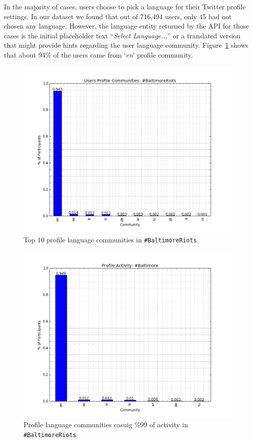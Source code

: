 In the majority of cases, users choose to pick a language for their
Twitter profile settings. In our dataset we found that out of 716,494
users, only 45 had not chosen any language. However, the language
entity returned by the API for those cases is the initial placeholder
text ``{\emph{Select Language...}}'' or a translated version that might provide
hints regarding the user language
community. Figure~\ref{fig:baltimore_profile_size} shows that about 94\% of the
users came from `{\emph{en}}' profile community.

\begin{figure}[htb]
\centering
\includegraphics[width=\columnwidth]{images/baltimore_profile_size.png}
\caption{Top 10 profile language communities in {\texttt{\#BaltimoreRiots}}}
\label{fig:baltimore_profile_size}
\end{figure}

\begin{figure}[htb]
\centering
\includegraphics[width=\columnwidth]{images/baltimore_profile_activity.png}
\caption{Profile language communities casuig \%99 of activity in {\texttt{\#BaltimoreRiots}}}
\label{fig:baltimore_profile_activity}
\end{figure}


